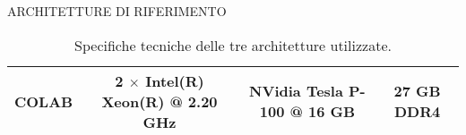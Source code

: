 \begin{frame}{ARCHITETTURE DI RIFERIMENTO}
\begin{minipage}{\linewidth}
\begin{minipage}{0.65\linewidth}
\begin{table}
\begin{adjustbox}{max width=\textwidth}
{\begin{tabular}{|c||c|c|c||}
                    \hline 
                    {\bfseries{COLAB}} & 2 $\times$ Intel(R) Xeon(R) @ 2.20 GHz & NVidia Tesla P-100 @ 16 GB & 27 GB DDR4\\
                    \hline
                \end{tabular}
                }%
                \end{adjustbox}
                \vspace{0.5cm}
                \caption{Specifiche tecniche delle tre architetture utilizzate.}
                \label{specifiche}
            \end{table}
        \end{minipage}
    \end{minipage}
\end{frame}